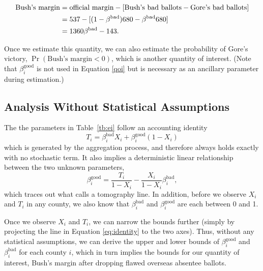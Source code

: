 \documentclass[11pt,titlepage]{article}
\newcommand{\bb}{\beta^{\text{bad}}}
\newcommand{\bg}{\beta^{\text{good}}}
\newcommand{\vs}{\vspace{-\baselineskip}}
\begin{document}
\vs
{}\baselineskip
\begin{align}
  \text{Bush's margin} & = \text{official margin}
  - [\text{Bush's bad ballots} - \text{Gore's bad ballots}] \notag\\
  & = 537 - [(1-\bb)680-\bb 680]\notag\\
  & = 1360 \bb - 143. \label{qoi}
\end{align}

\vs
{}\baselineskip
\noindent Once we estimate this quantity, we can also estimate the probability
of Gore's victory, $\Pr(\text{Bush's margin}<0)$, which is another
quantity of interest.  (Note that $\bg_i$ is not used in Equation
\ref{qoi} but is necessary as an ancillary parameter during
estimation.)

\subsection{Analysis Without Statistical Assumptions} \label{s:noassump}

The the parameters in Table~\ref{tb:ei} follow an accounting identity
\begin{equation} \label{eq:gid}
  T_i=\bb_i X_i+\bg_i (1-X_i)
\end{equation} 
which is generated by the aggregation process, and therefore always
holds exactly with no stochastic term. It also implies a deterministic
linear relationship between the two unknown parameters,
\begin{equation} \label{eq:identity}
\bg_i = \frac{T_i}{1-X_i}-\frac{X_i}{1-X_i}\bb_i,
\end{equation}
which traces out what \citet{king:97} calls a tomography line.  In
addition, before we observe $X_i$ and $T_i$ in any county, we also
know that $\bb_i$ and $\bg_i$ are each between 0 and 1.

Once we observe $X_i$ and $T_i$, we can narrow the bounds further
(simply by projecting the line in Equation \ref{eq:identity} to the
two axes).  Thus, without any statistical assumptions, we can derive
the upper and lower bounds of $\bg_i$ and $\bb_i$ for each county $i$,
which in turn implies the bounds for our quantity of interest, Bush's
margin after dropping flawed overseas absentee ballots.
\end{document}
